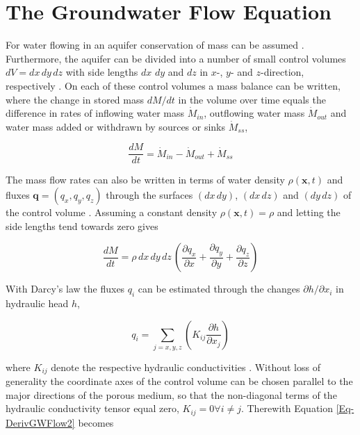 
\section{The Groundwater Flow Equation}
\label{Sec-GWFlowEq}

For water flowing in an aquifer conservation of mass can be assumed \parencite{Mays.2005}. 
Furthermore, the aquifer can be divided into a number of small control volumes $dV = dx \, dy \, dz$ with side lengths $dx$ $dy$ and $dz$ in $x$-, $y$- and $z$-direction, respectively \parencite{Fetter.2001}. 
On each of these control volumes a mass balance can be written, where the change in stored mass $dM / dt$ in the volume over time equals the difference in rates of inflowing water mass $\dot{M}_{in}$, outflowing water mass $\dot{M}_{out}$ and water mass added or withdrawn by sources or sinks $\dot{M}_{ss}$,

\begin{equation}
    \label{Eq-DerivGWFlow1}
    \frac{dM}{dt} = \dot{M}_{in} - \dot{M}_{out} + \dot{M}_{ss}
\end{equation}

The mass flow rates can also be written in terms of water density $\rho(\bm{x},t)$ and fluxes $\bm{q} = (q_x,q_y,q_z)$ through the surfaces $(dx \, dy)$, $(dx \, dz)$ and $(dy \, dz)$ of the control volume \parencite{Mays.2005}. 
Assuming a constant density $\rho(\bm{x},t) = \rho$ and letting the side lengths tend towards zero gives

\begin{equation}
    \label{Eq-DerivGWFlow2}
    \frac{dM}{dt} = \rho \, dx \, dy \, dz \, \left( \frac{\partial q_x}{\partial x} + \frac{\partial q_y}{\partial y} + \frac{\partial q_z}{\partial z} \right)
\end{equation}

With Darcy's law the fluxes $q_i$ can be estimated through the changes $\partial h / \partial x_i$ in hydraulic head $h$,

\begin{equation}
    \label{Eq-DerivGWFlow3}
    q_i = \sum_{j=x,y,z} \left( K_{ij} \frac{\partial h}{\partial x_j} \right)
\end{equation}

\noindent where $K_{ij}$ denote the respective hydraulic conductivities \parencite{Mays.2005}. 
Without loss of generality the coordinate axes of the control volume can be chosen parallel to the major directions of the porous medium, so that the non-diagonal terms of the hydraulic conductivity tensor equal zero, $K_{ij} = 0 \forall i \neq j$. 
Therewith Equation \eqref{Eq-DerivGWFlow2} becomes

